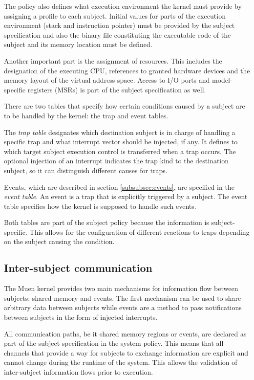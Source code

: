 The policy also defines what execution environment the kernel must provide by
assigning a profile to each subject. Initial values for parts of the execution
environment (stack and instruction pointer) must be provided by the subject
specification and also the binary file constituting the executable code of the
subject and its memory location must be defined.

Another important part is the assignment of resources. This includes the
designation of the executing CPU, references to granted hardware devices and the
memory layout of the virtual address space. Access to I/O ports and
model-specific registers (MSRs) is part of the subject specification as well.

There are two tables that specify how certain conditions caused by a subject
are to be handled by the kernel: the trap and event tables.

The \emph{trap table} designates which destination subject is in charge of
handling a specific trap and what interrupt vector should be injected, if any.
It defines to which target subject execution control is transferred when a trap
occurs. The optional injection of an interrupt indicates the trap kind to the
destination subject, so it can distinguish different causes for traps.

Events, which are described in section \ref{subsubsec:events}, are specified in
the \emph{event table}. An event is a trap that is explicitly triggered by a
subject. The event table specifies how the kernel is supposed to handle such
events.

Both tables are part of the subject policy because the information is
subject-specific. This allows for the configuration of different reactions to
traps depending on the subject causing the condition.

\subsection{Inter-subject communication}
The Muen kernel provides two main mechanisms for information flow between
subjects: shared memory and events. The first mechanism can be used to share
arbitrary data between subjects while events are a method to pass notifications
between subjects in the form of injected interrupts.

All communication paths, be it shared memory regions or events, are declared as
part of the subject specification in the system policy. This means that all
channels that provide a way for subjects to exchange information are explicit
and cannot change during the runtime of the system. This allows the validation
of inter-subject information flows prior to execution.

